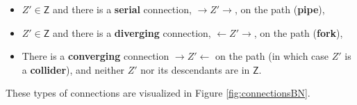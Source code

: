 \documentclass[
  10pt,
  dvipsnames,enabledeprecatedfontcommands]{scrartcl}
\begin{document}
\begin{itemize}

\item $Z' \in \mathsf{Z}$ and there is a \textbf{serial} connection, $\rightarrow Z' \rightarrow$, on the path (\textbf{pipe}),
\item  $Z'\in \mathsf{Z}$ and there is a \textbf{diverging} connection, $\leftarrow Z' \rightarrow $, on the path (\textbf{fork}),
\item There is a \textbf{converging} connection $\rightarrow Z' \leftarrow$ on the path (in which case $Z'$ is a \textbf{collider}), and neither $Z'$ nor its descendants are in $\mathsf{Z}$.
\end{itemize}

\vspace{1mm}

\noindent These types of connections are visualized in Figure
\ref{fig:connectionsBN}.
\end{document}
